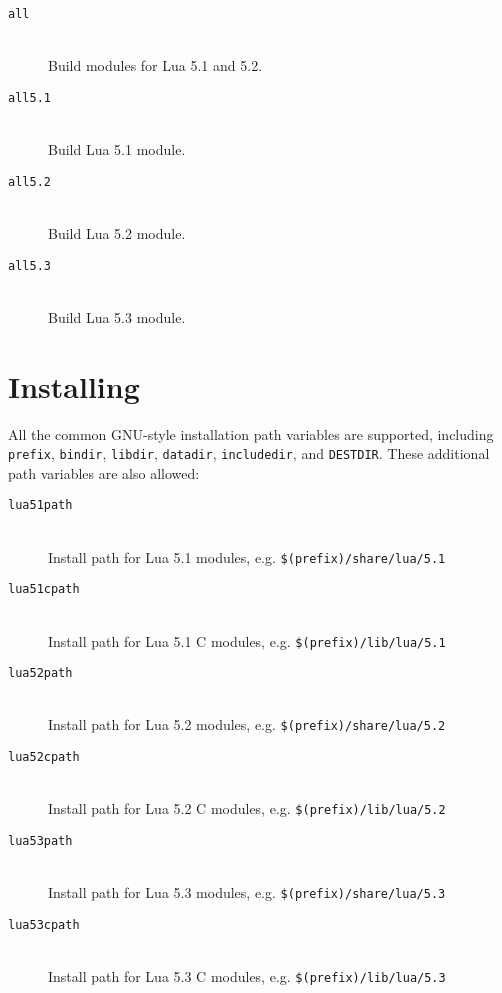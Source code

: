 \documentclass[11pt, oneside]{memoir}
\begin{document}
\begin{description}
\item[\texttt{all}] \hfill \\
Build modules for Lua 5.1 and 5.2.

\item[\texttt{all5.1}] \hfill \\
Build Lua 5.1 module.

\item[\texttt{all5.2}] \hfill \\
Build Lua 5.2 module.

\item[\texttt{all5.3}] \hfill \\
Build Lua 5.3 module.

\end{description}

\section{Installing}

All the common GNU-style installation path variables are supported, including \texttt{prefix}, \texttt{bindir}, \texttt{libdir}, \texttt{datadir}, \texttt{includedir}, and \texttt{DESTDIR}. These additional path variables are also allowed:

\begin{description}

\item[\texttt{lua51path}]  \hfill \\
Install path for Lua 5.1 modules, e.g. \texttt{\$(prefix)/share/lua/5.1}

\item[\texttt{lua51cpath}]  \hfill \\
Install path for Lua 5.1 C modules, e.g. \texttt{\$(prefix)/lib/lua/5.1}

\item[\texttt{lua52path}]  \hfill \\
Install path for Lua 5.2 modules, e.g. \texttt{\$(prefix)/share/lua/5.2}

\item[\texttt{lua52cpath}]  \hfill \\
Install path for Lua 5.2 C modules, e.g. \texttt{\$(prefix)/lib/lua/5.2}

\item[\texttt{lua53path}]  \hfill \\
Install path for Lua 5.3 modules, e.g. \texttt{\$(prefix)/share/lua/5.3}

\item[\texttt{lua53cpath}]  \hfill \\
Install path for Lua 5.3 C modules, e.g. \texttt{\$(prefix)/lib/lua/5.3}

\end{description}
\end{document}
